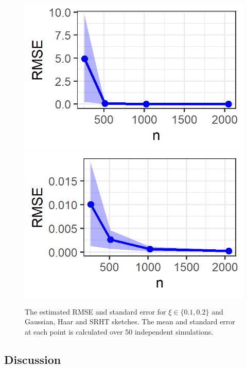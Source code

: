 \begin{figure}[ht]
\begin{minipage}[c]{0.76\textwidth}
\includegraphics{images/rmse_sketchsrht_xi0.1.png}
\includegraphics{images/rmse_sketchsrht_xi0.2.png}
\end{minipage}
\caption{The estimated RMSE and standard error for $\xi\in\{0.1,0.2\}$ and \iid Gaussian, Haar and SRHT sketches. The mean and standard error at each point is calculated over 50 independent simulations.}
\label{fig:rmse}
\end{figure}


\subsection{Discussion} \label{sec:conclusion}

